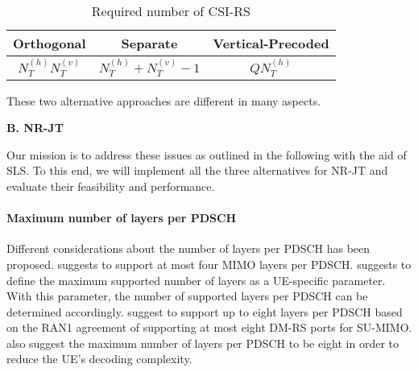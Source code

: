 \documentclass[a4paper,12pt]{article}%
\begin{document}
{\begin{table}[ht]
\caption{Required number of CSI-RS} \label{tab:fd-mimo-csi} \centering
  \begin{tabular}{|c|c|c|}
  \hline
Orthogonal & Separate & Vertical-Precoded \\
\hline
$N_T^{(h)} N_T^{(v)}$ & $N_T^{(h)}+N_T^{(v)} - 1$ & $QN_T^{(h)}$ \\
  \hline
  \end{tabular}
\end{table}



























These two alternative approaches are different in many aspects.



\noindent \textbf{B. NR-JT}

Our mission is to address these issues as outlined in the following with the aid of SLS. To this end, we will implement all the three alternatives for NR-JT and evaluate their feasibility and performance.


\paragraph{Maximum number of layers per PDSCH}

Different considerations about the number of layers per PDSCH has been proposed. \cite{R1-1710523} suggests to support at most four MIMO layers per PDSCH. \cite{R1-1710180} suggests to define the maximum supported number of layers as a UE-specific parameter. With this parameter, the number of supported layers per PDSCH can be determined accordingly. \cite{R1-1710141} suggest to support up to eight layers per PDSCH based on the RAN1 agreement of supporting at most eight DM-RS ports for SU-MIMO. \cite{R1-1710451} also suggest the maximum number of layers per PDSCH to be eight in order to reduce the UE's decoding complexity.


}
\end{document}
